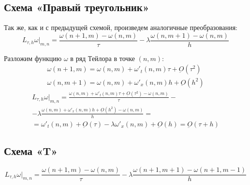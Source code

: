 \documentclass[titlepage]{article}
\begin{document}
\subsection{Схема «Правый треугольник»}
Так же, как и с предыдущей схемой, произведем аналогичные преобразования:
\begin{equation*}
	L_{\tau,h}{\omega} |_{m,n} = \frac{\omega(n+1,m) - \omega(n,m)}{\tau} - \lambda\frac{\omega(n,m+1) - \omega(n,m)}{h}
\end{equation*}

Разложим функцию $\omega$ в ряд Тейлора в точке $(n,m)$:
\begin{gather*}
	\omega(n+1,m) = \omega(n,m) + \omega'_t(n,m)\tau + \underbar{\textit{O}}(\tau^2) \\
	\omega(n,m+1) = \omega(n,m) + \omega'_x(n,m)h + \underbar{\textit{O}}(h^2)
\end{gather*}
\begin{multline*}
	L_{\tau,h}{\omega} |_{m,n} = \frac{\omega(n,m) + \omega'_t(n,m)\tau + \underbar{\textit{O}}(\tau^2) - \omega(n,m)}{\tau} - \\ 
	 - \lambda\frac{\omega(n,m) + \omega'_x(n,m)h + \underbar{\textit{O}}(h^2) -\omega(n,m)}{h} = \\
	 = \omega'_t(n,m) + \underbar{\textit{O}}(\tau) - \lambda\omega'_x(n,m) + \underbar{\textit{O}}(h) = \underbar{\textit{O}}(\tau + h)
\end{multline*}

\subsection{Схема «T»}
\begin{equation*}
	L_{\tau,h}{\omega} |_{m,n} = \frac{\omega(n+1,m) - \omega(n,m)}{\tau} - \lambda\frac{\omega(n+1,m+1) - \omega(n+1,m-1)}{h}
\end{equation*}
\end{document}
